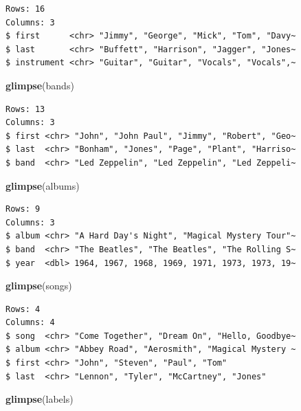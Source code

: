 \documentclass[
]{book}
\newenvironment{Shaded}{\begin{snugshade}}{\end{snugshade}}
\newcommand{\FunctionTok}[1]{\textcolor[rgb]{0.13,0.29,0.53}{\textbf{#1}}}
\newcommand{\NormalTok}[1]{#1}
\begin{document}
\begin{verbatim}
Rows: 16
Columns: 3
$ first      <chr> "Jimmy", "George", "Mick", "Tom", "Davy~
$ last       <chr> "Buffett", "Harrison", "Jagger", "Jones~
$ instrument <chr> "Guitar", "Guitar", "Vocals", "Vocals",~
\end{verbatim}

\begin{Shaded}
\begin{Highlighting}[]
\FunctionTok{glimpse}\NormalTok{(bands)}
\end{Highlighting}
\end{Shaded}

\begin{verbatim}
Rows: 13
Columns: 3
$ first <chr> "John", "John Paul", "Jimmy", "Robert", "Geo~
$ last  <chr> "Bonham", "Jones", "Page", "Plant", "Harriso~
$ band  <chr> "Led Zeppelin", "Led Zeppelin", "Led Zeppeli~
\end{verbatim}

\begin{Shaded}
\begin{Highlighting}[]
\FunctionTok{glimpse}\NormalTok{(albums)}
\end{Highlighting}
\end{Shaded}

\begin{verbatim}
Rows: 9
Columns: 3
$ album <chr> "A Hard Day's Night", "Magical Mystery Tour"~
$ band  <chr> "The Beatles", "The Beatles", "The Rolling S~
$ year  <dbl> 1964, 1967, 1968, 1969, 1971, 1973, 1973, 19~
\end{verbatim}

\begin{Shaded}
\begin{Highlighting}[]
\FunctionTok{glimpse}\NormalTok{(songs)}
\end{Highlighting}
\end{Shaded}

\begin{verbatim}
Rows: 4
Columns: 4
$ song  <chr> "Come Together", "Dream On", "Hello, Goodbye~
$ album <chr> "Abbey Road", "Aerosmith", "Magical Mystery ~
$ first <chr> "John", "Steven", "Paul", "Tom"
$ last  <chr> "Lennon", "Tyler", "McCartney", "Jones"
\end{verbatim}

\begin{Shaded}
\begin{Highlighting}[]
\FunctionTok{glimpse}\NormalTok{(labels)}
\end{Highlighting}
\end{Shaded}
\end{document}
